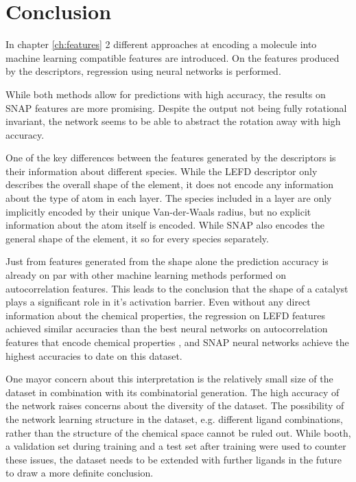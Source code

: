 
\chapter{Conclusion}
\label{ch:Conclusion}
In chapter \ref{ch:features} 2 different approaches at encoding a molecule into machine learning compatible features are introduced.
On the features produced by the descriptors, regression using neural networks is performed.

While both methods allow for predictions with high accuracy, the results on SNAP features are more promising.
Despite the output not being fully rotational invariant, the network seems to be able to abstract the rotation away with high accuracy.

One of the key differences between the features generated by the descriptors is their information about 
different species.
While the LEFD descriptor only describes the overall shape of the element, it does not encode any information about the 
type of atom in each layer.
The species included in a layer are only implicitly encoded by their unique Van-der-Waals radius, but no explicit information about the 
atom itself is encoded.
While SNAP also encodes the general shape of the element, it so for every species separately.

Just from features generated from the shape alone the prediction accuracy is already on par with other machine learning methods performed on autocorrelation features.
This leads to the conclusion that the shape of a catalyst plays a significant role in it's activation barrier.
Even without any direct information about the chemical properties, the regression on LEFD features achieved similar accuracies than
the best neural networks on autocorrelation features that encode chemical properties \cite{friederich_dos},
and SNAP neural networks achieve the highest accuracies to date on this dataset.

One mayor concern about this interpretation is the relatively small size of the dataset in combination 
with its combinatorial generation.
The high accuracy of the network raises concerns about the diversity of the dataset.
The possibility of the network learning structure in the dataset, e.g. different ligand combinations,
rather than the structure of the chemical space cannot be ruled out.
While booth, a validation set during training and a test set after training were used to counter these issues,
the dataset needs to be extended with further ligands in the future to draw a more definite conclusion.

